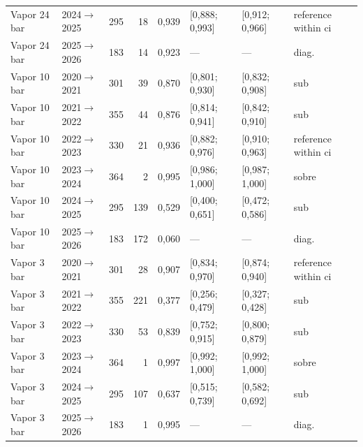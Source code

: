 {\begin{xltabular}{\linewidth}{@{}llrrrlll@{}}
Vapor 24 bar & 2024$\to$2025 & 295 & 18 & 0,939 & [0,888; 0,993] & [0,912; 0,966] & reference within ci \\
Vapor 24 bar & 2025$\to$2026 & 183 & 14 & 0,923 & --- & --- & diag. \\
Vapor 10 bar & 2020$\to$2021 & 301 & 39 & 0,870 & [0,801; 0,930] & [0,832; 0,908] & sub \\
Vapor 10 bar & 2021$\to$2022 & 355 & 44 & 0,876 & [0,814; 0,941] & [0,842; 0,910] & sub \\
Vapor 10 bar & 2022$\to$2023 & 330 & 21 & 0,936 & [0,882; 0,976] & [0,910; 0,963] & reference within ci \\
Vapor 10 bar & 2023$\to$2024 & 364 & 2 & 0,995 & [0,986; 1,000] & [0,987; 1,000] & sobre \\
Vapor 10 bar & 2024$\to$2025 & 295 & 139 & 0,529 & [0,400; 0,651] & [0,472; 0,586] & sub \\
Vapor 10 bar & 2025$\to$2026 & 183 & 172 & 0,060 & --- & --- & diag. \\
Vapor 3 bar & 2020$\to$2021 & 301 & 28 & 0,907 & [0,834; 0,970] & [0,874; 0,940] & reference within ci \\
Vapor 3 bar & 2021$\to$2022 & 355 & 221 & 0,377 & [0,256; 0,479] & [0,327; 0,428] & sub \\
Vapor 3 bar & 2022$\to$2023 & 330 & 53 & 0,839 & [0,752; 0,915] & [0,800; 0,879] & sub \\
Vapor 3 bar & 2023$\to$2024 & 364 & 1 & 0,997 & [0,992; 1,000] & [0,992; 1,000] & sobre \\
Vapor 3 bar & 2024$\to$2025 & 295 & 107 & 0,637 & [0,515; 0,739] & [0,582; 0,692] & sub \\
Vapor 3 bar & 2025$\to$2026 & 183 & 1 & 0,995 & --- & --- & diag. \\
\end{xltabular}
}
